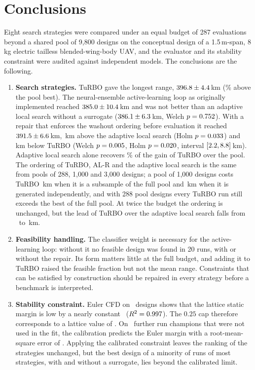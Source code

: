 \section{Conclusions}
\label{sec:conclusion}

Eight search strategies were compared under an equal budget of 287 evaluations beyond a shared pool of 9,800 designs on the conceptual design of a 1.5\,m-span, 8\,kg electric tailless blended-wing-body UAV, and the evaluator and its stability constraint were audited against independent models. The conclusions are the following.

\begin{enumerate}
    \item \textbf{Search strategies.} TuRBO gave the longest range, $396.8 \pm 4.4$\,km (\NvGainPctTurbo\% above the pool best). The neural-ensemble active-learning loop as originally implemented reached $385.0 \pm 10.4$\,km and was not better than an adaptive local search without a surrogate ($386.1 \pm 6.3$\,km, Welch $p = 0.752$). With a repair that enforces the washout ordering before evaluation it reached $391.5 \pm 6.6$\,km, \NvDALRvAdapt\,km above the adaptive local search (Holm $p = 0.033$) and \NvDTurbovALR\,km below TuRBO (Welch $p = 0.005$, Holm $p = 0.020$, interval $[2.2, 8.8]$\,km). Adaptive local search alone recovers \NvShareAdapt\% of the gain of TuRBO over the pool. The ordering of TuRBO, AL-R and the adaptive local search is the same from pools of 288, 1{,}000 and 3{,}000 designs; a pool of 1{,}000 designs costs TuRBO \NpTurboLossB\,km when it is a subsample of the full pool and \NpIndTurboVsFull\,km when it is generated independently, and with 288 pool designs every TuRBO run still exceeds the best of the full pool. At twice the budget the ordering is unchanged, but the lead of TuRBO over the adaptive local search falls from \NlTvAAD\ to \NlTvACD\,km.
    \item \textbf{Feasibility handling.} The classifier weight is necessary for the active-learning loop: without it no feasible design was found in 20 runs, with or without the repair. Its form matters little at the full budget, and adding it to TuRBO raised the feasible fraction but not the mean range. Constraints that can be satisfied by construction should be repaired in every strategy before a benchmark is interpreted.
    \item \textbf{Stability constraint.} Euler CFD on \NcalN\ designs shows that the lattice static margin is low by a nearly constant \NcalA\ ($R^2 = 0.997$). The $0.25$ cap therefore corresponds to a lattice value of \NcalCapEquiv. On \NoosN\ further run champions that were not used in the fit, the calibration predicts the Euler margin with a root-mean-square error of \NoosRmse. Applying the calibrated constraint leaves the ranking of the strategies unchanged, but the best design of a minority of runs of most strategies, with and without a surrogate, lies beyond the calibrated limit.

\end{enumerate}
